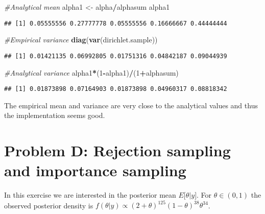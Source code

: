 \documentclass[]{article}
\newenvironment{Shaded}{\begin{snugshade}}{\end{snugshade}}
\newcommand{\CommentTok}[1]{\textcolor[rgb]{0.56,0.35,0.01}{\textit{#1}}}
\newcommand{\DecValTok}[1]{\textcolor[rgb]{0.00,0.00,0.81}{#1}}
\newcommand{\KeywordTok}[1]{\textcolor[rgb]{0.13,0.29,0.53}{\textbf{#1}}}
\newcommand{\NormalTok}[1]{#1}
\newcommand{\OperatorTok}[1]{\textcolor[rgb]{0.81,0.36,0.00}{\textbf{#1}}}
\newcommand{\StringTok}[1]{\textcolor[rgb]{0.31,0.60,0.02}{#1}}
\begin{document}
\begin{Shaded}
\begin{Highlighting}[]
\CommentTok{#Analytical mean}
\NormalTok{alpha1 <-}\StringTok{ }\NormalTok{alpha}\OperatorTok{/}\NormalTok{alphasum}
\NormalTok{alpha1}
\end{Highlighting}
\end{Shaded}

\begin{verbatim}
## [1] 0.05555556 0.27777778 0.05555556 0.16666667 0.44444444
\end{verbatim}

\begin{Shaded}
\begin{Highlighting}[]
\CommentTok{#Empirical variance}
\KeywordTok{diag}\NormalTok{(}\KeywordTok{var}\NormalTok{(dirichlet.sample))}
\end{Highlighting}
\end{Shaded}

\begin{verbatim}
## [1] 0.01421135 0.06992805 0.01751316 0.04842187 0.09044939
\end{verbatim}

\begin{Shaded}
\begin{Highlighting}[]
\CommentTok{#Analytical variance}
\NormalTok{alpha1}\OperatorTok{*}\NormalTok{(}\DecValTok{1}\OperatorTok{-}\NormalTok{alpha1)}\OperatorTok{/}\NormalTok{(}\DecValTok{1}\OperatorTok{+}\NormalTok{alphasum)}
\end{Highlighting}
\end{Shaded}

\begin{verbatim}
## [1] 0.01873898 0.07164903 0.01873898 0.04960317 0.08818342
\end{verbatim}

The empirical mean and variance are very close to the analytical values
and thus the implementation seems good.

\hypertarget{problem-d-rejection-sampling-and-importance-sampling}{%
\section{Problem D: Rejection sampling and importance
sampling}\label{problem-d-rejection-sampling-and-importance-sampling}}

In this exercise we are interested in the posterior mean
\(E\big[\theta|y\big]\). For \(\theta \in (0,1)\) the observed posterior
density is
\(f(\theta|y) \propto (2+\theta)^{125}(1-\theta)^{38}\theta^{34}\).
\end{document}
